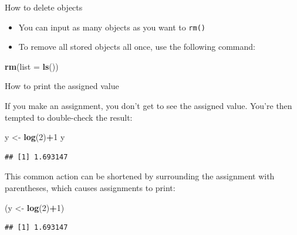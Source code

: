 \documentclass[ignorenonframetext,]{beamer}
\newenvironment{Shaded}{\begin{snugshade}}{\end{snugshade}}
\newcommand{\DataTypeTok}[1]{\textcolor[rgb]{0.13,0.29,0.53}{#1}}
\newcommand{\DecValTok}[1]{\textcolor[rgb]{0.00,0.00,0.81}{#1}}
\newcommand{\KeywordTok}[1]{\textcolor[rgb]{0.13,0.29,0.53}{\textbf{#1}}}
\newcommand{\NormalTok}[1]{#1}
\newcommand{\OperatorTok}[1]{\textcolor[rgb]{0.81,0.36,0.00}{\textbf{#1}}}
\newcommand{\StringTok}[1]{\textcolor[rgb]{0.31,0.60,0.02}{#1}}
\begin{document}
\begin{frame}[fragile]{How to delete objects}
\protect\hypertarget{how-to-delete-objects-1}{}

\begin{itemize}
\item
  You can input as many objects as you want to \texttt{rm()}
\item
  To remove all stored objects all once, use the following command:
\end{itemize}

\begin{Shaded}
\begin{Highlighting}[]
\KeywordTok{rm}\NormalTok{(}\DataTypeTok{list =} \KeywordTok{ls}\NormalTok{())}
\end{Highlighting}
\end{Shaded}

\end{frame}

\begin{frame}[fragile]{How to print the assigned value}
\protect\hypertarget{how-to-print-the-assigned-value}{}

If you make an assignment, you don't get to see the assigned value.
You're then tempted to double-check the result:

\begin{Shaded}
\begin{Highlighting}[]
\NormalTok{y <-}\StringTok{ }\KeywordTok{log}\NormalTok{(}\DecValTok{2}\NormalTok{)}\OperatorTok{+}\DecValTok{1}
\NormalTok{y}
\end{Highlighting}
\end{Shaded}

\begin{verbatim}
## [1] 1.693147
\end{verbatim}

This common action can be shortened by surrounding the assignment with
parentheses, which causes assignments to print:

\begin{Shaded}
\begin{Highlighting}[]
\NormalTok{(y <-}\StringTok{ }\KeywordTok{log}\NormalTok{(}\DecValTok{2}\NormalTok{)}\OperatorTok{+}\DecValTok{1}\NormalTok{)}
\end{Highlighting}
\end{Shaded}

\begin{verbatim}
## [1] 1.693147
\end{verbatim}

\end{frame}
\end{document}
